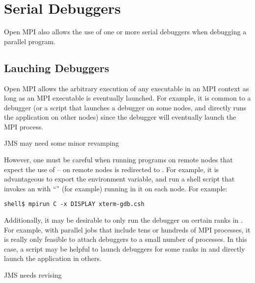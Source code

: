 
\section{Serial Debuggers}
\label{sec:debug-serial}

Open MPI also allows the use of one or more serial debuggers when debugging
a parallel program.  


\subsection{Lauching Debuggers}

Open MPI allows the arbitrary execution of any executable in an MPI
context as long as an MPI executable is eventually launched.  For
example, it is common to  a debugger (or a script that
launches a debugger on some nodes, and directly runs the application
on other nodes) since the debugger will eventually launch the MPI
process.

{\Huge JMS may need some minor revamping}

However, one must be careful when running programs on remote nodes
that expect the use of  --  on remote nodes is
redirected to .  For example, it is advantageous to
export the  environment variable, and run a shell
script that invokes an  with ``'' (for example)
running in it on each node.  For example:

\lstset{style=lam-cmdline}
\begin{lstlisting}
shell$ mpirun C -x DISPLAY xterm-gdb.csh
\end{lstlisting}

Additionally, it may be desirable to only run the debugger on certain
ranks in \mcw.  For example, with parallel jobs that include tens or
hundreds of MPI processes, it is really only feasible to attach
debuggers to a small number of processes.  In this case, a script may
be helpful to launch debuggers for some ranks in \mcw and directly
launch the application in others.

{\Huge JMS needs revising}

